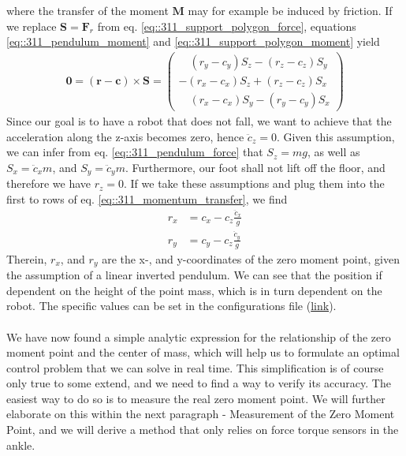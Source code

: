 where the transfer of the moment $\bm{M}$ may for example be induced by friction. If we replace $\bm{S}=\bm{F}_r$ from eq. \ref{eq::311_support_polygon_force}, equations \ref{eq::311_pendulum_moment} and \ref{eq::311_support_polygon_moment} yield 
\begin{align}
	\bm{0} = (\bm{r}-\bm{c})\times\bm{S} = \begin{pmatrix}
	\quad(r_y - c_y)S_z - (r_z - c_z)S_y \\
	-(r_x - c_x)S_z + (r_z - c_z)S_x \\
	\quad(r_x - c_x)S_y - (r_y - c_y)S_x
	\end{pmatrix}
	\label{eq::311_momentum_transfer}
\end{align}
Since our goal is to have a robot that does not fall, we want to achieve that the acceleration along the z-axis becomes zero, hence $\ddot{c}_z=0$. Given this assumption, we can infer from eq. \ref{eq::311_pendulum_force} that $S_z=mg$, as well as $S_x = \ddot{c}_xm$, and $S_y = \ddot{c}_ym$. Furthermore, our foot shall not lift off the floor, and therefore we have $r_z=0$. If we take these assumptions and plug them into the first to rows of eq. \ref{eq::311_momentum_transfer}, we find
\begin{align}
	r_x &= c_x - c_z\frac{\ddot{c}_x}{g}\\
	r_y &= c_y - c_z\frac{\ddot{c}_y}{g}
	\label{eq::311_zmp}
\end{align}
Therein, $r_x$, and $r_y$ are the x-, and y-coordinates of the zero moment point, given the assumption of a linear inverted pendulum. We can see that the position if dependent on the height of the point mass, which is in turn dependent on the robot. The specific values can be set in the configurations file (\href{https://github.com/mhubii/nmpc_pattern_generator/blob/bc79a6d4f9bcfd3794146355af44429f5b7a9fe0/libs/pattern_generator/configs.yaml#L27}{link}).
\\\\
We have now found a simple analytic expression for the relationship of the zero moment point and the center of mass, which will help us to formulate an optimal control problem that we can solve in real time. This simplification is of course only true to some extend, and we need to find a way to verify its accuracy. The easiest way to do so is to measure the real zero moment point. We will further elaborate on this within the next paragraph - Measurement of the Zero Moment Point, and we will derive a method that only relies on force torque sensors in the ankle.
